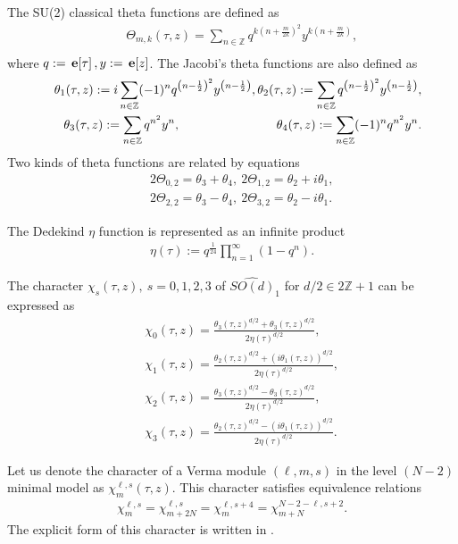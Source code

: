 \documentclass[a4paper,12pt]{article}
\numberwithin{equation}{section}
\newcommand{\Th}{\Theta}
\newcommand{\Zb}{{\mathbb Z}}
\newcommand{\e}[1]{\,{\bf e}\!\left[#1\right]}
\begin{document}
The SU(2) classical theta functions are defined as
\begin{eqnarray*}
&& \Th_{m,k}(\tau,z)=\sum_{n\in \Zb}q^{k\left(n+\frac{m}{2k}\right)^2}
 y^{k\left(n+\frac{m}{2k}\right)},\\
\end{eqnarray*}
where $q:=\e{\tau},y:=\e{z}$.
The Jacobi's theta functions are also defined as
\begin{eqnarray*}
&& \theta_{1}(\tau,z):=i\sum_{n\in \Zb}(-1)^n q^{\left(n-\frac{1}{2}\right)^2}
 y^{\left(n-\frac{1}{2}\right)},
 \theta_{2}(\tau,z):=\sum_{n\in \Zb} q^{\left(n-\frac{1}{2}\right)^2}
 y^{\left(n-\frac{1}{2}\right)},\\
&& \theta_{3}(\tau,z):=\sum_{n\in \Zb} q^{n^2}y^{n},\hspace{2.7cm}
 \theta_{4}(\tau,z):=\sum_{n\in \Zb}(-1)^n q^{n^2}y^{n}.\\
\end{eqnarray*}
Two kinds of theta functions are related by equations
\begin{eqnarray*}
 && 2\Th_{0,2}=\theta_3+\theta_4 ,\ 2\Th_{1,2}=\theta_2+i\theta_1, \\
 && 2\Th_{2,2}=\theta_3-\theta_4 ,\ 2\Th_{3,2}=\theta_2-i\theta_1.
\end{eqnarray*}

The Dedekind $\eta$ function is represented as an infinite product
\begin{eqnarray*}
 \eta(\tau):=q^{\frac1{24}}\prod_{n=1}^{\infty}(1-q^n).
\end{eqnarray*}

The character $\chi_s(\tau,z),\ s=0,1,2,3$ 
of $\widehat{SO(d)}_1$ for $d/2 \in 2\Zb+1$ can be
expressed as
\begin{eqnarray*}
 && \chi_0(\tau,z)=\frac{\theta_3(\tau,z)^{d/2}
+\theta_3(\tau,z)^{d/2}}{2\eta(\tau)^{d/2}},\\
 && \chi_1(\tau,z)=\frac{\theta_2(\tau,z)^{d/2}
+(i\theta_1(\tau,z))^{d/2}}{2\eta(\tau)^{d/2}},\\
 && \chi_2(\tau,z)=\frac{\theta_3(\tau,z)^{d/2}
-\theta_3(\tau,z)^{d/2}}{2\eta(\tau)^{d/2}},\\
 && \chi_3(\tau,z)=\frac{\theta_2(\tau,z)^{d/2}
-(i\theta_1(\tau,z))^{d/2}}{2\eta(\tau)^{d/2}}.
\end{eqnarray*}

Let us denote the character of 
a Verma module $(\ell,m,s)$ in the level $(N-2)$ minimal model 
as $\chi_m^{\ell,s}(\tau,z)$. This character satisfies equivalence
relations
\begin{eqnarray*}
 \chi_m^{\ell,s}=\chi_{m+2N}^{\ell,s}=\chi_m^{\ell,s+4}
=\chi_{m+N}^{N-2-\ell,s+2}.
\end{eqnarray*}
The explicit form of this character is written in \cite{Gep88}.
\end{document}
